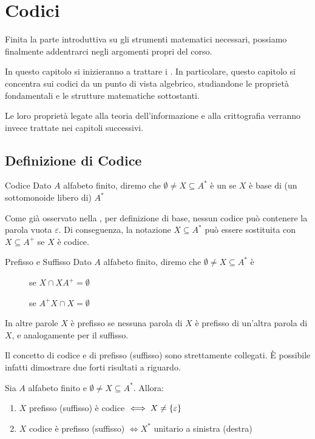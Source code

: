 \chapter{Codici}

Finita la parte introduttiva su gli strumenti matematici necessari,
possiamo finalmente addentrarci negli argomenti propri del corso.

In questo capitolo si inizieranno a trattare i .
In particolare, questo capitolo si concentra sui codici da un punto di vista algebrico, studiandone le proprietà fondamentali e le strutture matematiche sottostanti.

Le loro proprietà legate alla teoria dell'informazione e alla crittografia verranno invece trattate nei capitoli successivi.

\section{Definizione di Codice}
\begin{definition}{Codice}
  Dato \(A\) alfabeto finito, diremo che \(\emptyset \neq X \subseteq A^*\) è un  se \(X\) è base di (un sottomonoide libero di) \(A^*\)
\end{definition}

\begin{observation}{}
  Come già osservato nella , per definizione di base, nessun codice può contenere la parola vuota \(\varepsilon\).
  Di conseguenza, la notazione \(X \subseteq A^*\) può essere sostituita con \(X \subseteq A^+\) se \(X\) è codice.
\end{observation}

\begin{definition}[namedlabel={def:prefix_suffix}{Prefisso e Suffisso}]{Prefisso e Suffisso}
  Dato \(A\) alfabeto finito, diremo che \(\emptyset \neq X \subseteq A^*\) è
  \begin{description}
    \item[] se \(X\cap XA^+ = \emptyset\)
    \item[] se \(A^+X \cap X = \emptyset\)
  \end{description}
\end{definition}

In altre parole \(X\) è prefisso se nessuna parola di \(X\) è prefisso di un'altra parola di \(X\), e analogamente per il suffisso.

Il concetto di codice e di prefisso (suffisso) sono strettamente collegati.
È possibile infatti dimostrare due forti risultati a riguardo.
\begin{theorem}[label=thm:prefix_suffix_code]{}
  Sia \(A\) alfabeto finito e \(\emptyset \neq X \subseteq A^*\).
  Allora:
  \begin{enumerate}
    \item \(X\) prefisso (suffisso) è codice \(\iff X \neq \set{\varepsilon}\)
    \item \(X\) codice è prefisso (suffisso) \(\iff X^*\) unitario a sinistra (destra)
  \end{enumerate}
\end{theorem}


